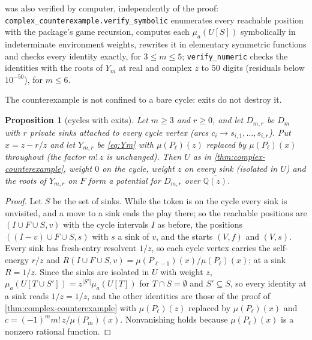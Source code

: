 \documentclass[11pt]{amsart}
\theoremstyle{plain}
\newtheorem{proposition}[theorem]{Proposition}
\theoremstyle{definition}
\theoremstyle{remark}
\numberwithin{equation}{section}
\newcommand{\code}[1]{{\ttfamily\nolinkurl{#1}}}
\newcommand{\QQ}{\mathbb{Q}}
\newcommand{\Qzbar}{\overline{\QQ(z)}}
\begin{document}
 was also verified by computer, independently of the proof: \code{complex_counterexample.verify_symbolic} enumerates every reachable position with the package's game recursion, computes each $\mu_a(U[S])$ symbolically in indeterminate environment weights, rewrites it in elementary symmetric functions and checks every identity exactly, for $3\le m\le5$; \code{verify_numeric} checks the identities with the roots of $Y_m$ at real and complex $z$ to $50$ digits (residuals below $10^{-50}$), for $m\le6$.

The counterexample is not confined to a bare cycle: exits do not destroy it.

\begin{proposition}[cycles with exits]\label{prop:sinks}
Let $m\ge3$ and $r\ge0$, and let $D_{m,r}$ be $D_m$ with $r$ private sinks attached to every cycle vertex \textup{(}arcs $c_i\to s_{i,1},\dots,s_{i,r}$\textup{)}. Put $x=z-r/z$ and let $Y_{m,r}$ be \eqref{eq:Ym} with $\mu(P_\ell)(z)$ replaced by $\mu(P_\ell)(x)$ throughout \textup{(}the factor $m!\,z$ is unchanged\textup{)}. Then $U$ as in \cref{thm:complex-counterexample}, weight $0$ on the cycle, weight $z$ on every sink \textup{(}isolated in $U$\textup{)} and the roots of $Y_{m,r}$ on $F$ form a potential for $D_{m,r}$ over $\Qzbar$.
\end{proposition}
\begin{proof}
Let $S$ be the set of sinks. While the token is on the cycle every sink is unvisited, and a move to a sink ends the play there; so the reachable positions are $(I\cup F\cup S,v)$ with the cycle intervals $I$ as before, the positions $((I-v)\cup F\cup S,s)$ with $s$ a sink of $v$, and the starts $(V,f)$ and $(V,s)$. Every sink has fresh-entry resolvent $1/z$, so each cycle vertex carries the self-energy $r/z$ and $R(I\cup F\cup S,v)=\mu(P_{\ell-1})(x)/\mu(P_\ell)(x)$; at a sink $R=1/z$. Since the sinks are isolated in $U$ with weight $z$, $\mu_a(U[T\cup S'])=z^{|S'|}\mu_a(U[T])$ for $T\cap S=\emptyset$ and $S'\subseteq S$, so every identity at a sink reads $1/z=1/z$, and the other identities are those of the proof of \cref{thm:complex-counterexample} with $\mu(P_\ell)(z)$ replaced by $\mu(P_\ell)(x)$ and $c=(-1)^mm!\,z/\mu(P_m)(x)$. Nonvanishing holds because $\mu(P_\ell)(x)$ is a nonzero rational function.
\end{proof}
\end{document}
